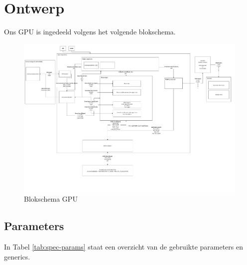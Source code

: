 \documentclass{scrreprt} %
\date{22 november 2013}
\begin{document}
\chapter{Ontwerp}
Ons GPU is ingedeeld volgens het volgende blokschema.
\begin{figure}[H]
\centering
	\includegraphics[width=\linewidth]{resource/systeemdrawing-rc.pdf}
	\caption{Blokschema GPU}
	\label{fig:Blokschema GPU}
\end{figure}

\section{Parameters}
In Tabel \ref{tab:spec-params} staat een overzicht van de gebruikte parameters en generics.
\end{document}
